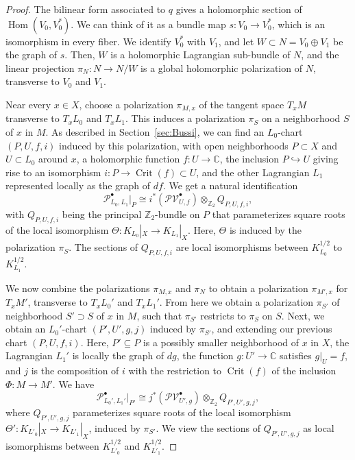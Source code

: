 \documentclass [11pt]{amsart}
\theoremstyle{remark}
\def\zz {{\mathbb{Z}}}
\def\cc {{\mathbb{C}}}
\def\C{\cc}
\def\Z {\zz}
\def\Hom {\operatorname{Hom}}
\def\Pb {\mathcal{P}^\bullet}
\def\PVb {\mathcal{PV}^\bullet}
\def\Crit{\operatorname{Crit}}
\begin{document}
\begin{proof}
The bilinear form associated to $q$ gives a holomorphic section of $\Hom(V_0, V_0^*)$. We can think of it as a bundle map $s: V_0 \to V_0^*$, which is an isomorphism in every fiber. We identify $V_0^*$ with $V_1$, and let $W \subset N=V_0 \oplus V_1$ be the graph of $s$. Then, $W$ is a holomorphic Lagrangian sub-bundle of $N$, and the linear projection $\pi_N : N \to N/W$ is a global holomorphic polarization of $N$, transverse to $V_0$ and $V_1$. 

Near every $x \in X$, choose a polarization $\pi_{M, x}$ of the tangent space $T_xM$ transverse to $T_xL_0$ and $T_xL_1$. This induces a polarization $\pi_S$ on a neighborhood $S$ of $x$ in $M$.  As described in Section~\ref{sec:Bussi}, we can find an $L_0$-chart $(P, U, f, i)$ induced by this polarization, with open neighborhoods $P \subset X$ and $U \subset L_0$ around $x$, a holomorphic function $f: U \to \C$, the inclusion $ P \hookrightarrow U$ giving rise to an isomorphism $i: P \to \Crit(f) \subset U$, and the other Lagrangian $L_1$ represented locally as the graph of $df$. We get a natural identification
\begin{equation}
\label{eq:P01}
 \Pb_{L_0, L_1}|_P \cong i^*(\PVb_{U, f}) \otimes_{\Z_2} Q_{P, U, f, i},
\end{equation}
with $Q_{P, U, f, i}$ being the principal $\Z_2$-bundle on $P$ that parameterizes square roots of the local isomorphism $\Theta: K_{L_0}|_X \to K_{L_1}|_X$. Here, $\Theta$ is induced by the polarization $\pi_S$. The sections of $Q_{P, U, f, i}$ are local isomorphisms between $K_{L_0}^{1/2}$ to $ K_{L_1}^{1/2}$.

We now combine the polarizations $\pi_{M, x}$ and $\pi_N$ to obtain a polarization $\pi_{M', x}$ for $T_xM'$, transverse to $T_xL_0'$ and $T_xL_1'$. From here we obtain a polarization $\pi_{S'}$ of  neighborhood $S' \supset S$ of $x$ in $M$, such that $\pi_{S'}$ restricts to $\pi_S$ on $S$. Next, we obtain an $L_0'$-chart $(P', U', g, j)$ induced by $\pi_{S'}$, and extending our previous chart $(P, U, f, i)$. Here, $P' \subseteq P$ is a possibly smaller neighborhood of $x$ in $X$, the Lagrangian $L_1'$ is locally the graph of $dg$, the function $g: U' \to \C$ satisfies $g|_U = f$, and $j$ is the composition of $i$ with the restriction to $\Crit(f)$ of the inclusion $\Phi: M \to M'$. We have
\begin{equation}
\label{eq:P01'}
  \Pb_{L_0', L_1'}|_{P'} \cong j^*(\PVb_{U', g}) \otimes_{\Z_2} Q_{P', U', g, j},
\end{equation}
where $Q_{P', U', g, j}$ parameterizes square roots of the local isomorphism $\Theta': K_{L'_0}|_X \to K_{L'_1}|_X$, induced by $\pi_{S'}$.  We view the sections of $Q_{P', U', g, j}$ as local isomorphisms between $K_{L'_0}^{1/2}$ and $ K_{L'_1}^{1/2}$.


\end{proof}
\end{document}

